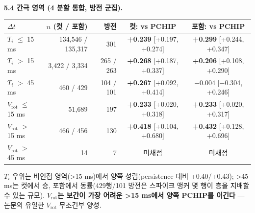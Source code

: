 \documentclass[10pt,a4paper]{article}
\newcommand{\Ti}{\ensuremath{T_i}}
\newcommand{\Vrot}{\ensuremath{V_\mathrm{rot}}}
\newcommand{\pass}[1]{\textbf{#1}}
\begin{document}
\textbf{5.4 간극 영역 (4 분할 통합, 방전 군집).}
\begin{center}\small
\begin{tabular}{lrrcc}\toprule
$\Delta t$ & $n$ (컷 / 포함) & 방전 & 컷: vs PCHIP & 포함: vs PCHIP \\ \midrule
\Ti{} $\leq$ 15 ms & 134,546 / 135,317 & 301 & \pass{+0.239} [+0.197, +0.274] & \pass{+0.299} [+0.244, +0.347] \\
\Ti{} $>$ 15 ms & 3,422 / 3,334 & 265 / 263 & \pass{+0.268} [+0.187, +0.337] & \pass{+0.206} [+0.108, +0.290] \\
\Ti{} $>$ 45 ms & 460 / 429 & 104 / 101 & \pass{+0.267} [+0.092, +0.414] & $-0.004$ [$-$0.304, +0.246] \\
\Vrot{} $\leq$ 15 ms & 51,689 & 197 & \pass{+0.233} [+0.020, +0.318] & \pass{+0.233} [+0.020, +0.317] \\
\Vrot{} $>$ 15 ms & 466 / 456 & 130 & \pass{+0.418} [+0.104, +0.680] & \pass{+0.432} [+0.128, +0.696] \\
\Vrot{} $>$ 45 ms & 14 & 7 & 미채점 & 미채점 \\ \bottomrule
\end{tabular}
\end{center}
\Ti{} 우위는 비인접 영역(>15 ms)에서 양쪽 성립(persistence 대비 +0.40/+0.43); >45 ms는 컷에서 승, 포함에서 동률(429행/101 방전은 스파이크 앵커 몇 행이 층을 지배할 수 있는 규모). \textbf{\Vrot{}는 보간이 가장 어려운 >15 ms에서 양쪽 PCHIP를 이긴다} — 논문의 유일한 \Vrot{} 무조건부 양성.
\end{document}
